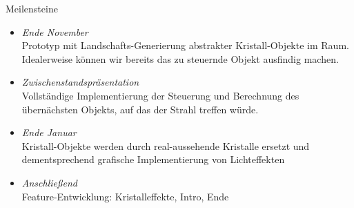 \begin{frame}{Meilensteine}
	\begin{itemize}
		\item \emph{Ende November}\\
		Prototyp mit Landschafts-Generierung abstrakter \glqq Kristall\grqq -Objekte im Raum. Idealerweise können wir bereits das zu steuernde Objekt ausfindig machen.
		\item \emph{Zwischenstandspräsentation}\\
		Vollständige Implementierung der Steuerung und Berechnung des übernächsten Objekts, auf das der Strahl treffen würde.
		\item \emph{Ende Januar}\\
		Kristall-Objekte werden durch real-aussehende Kristalle ersetzt und dementsprechend grafische Implementierung von Lichteffekten
		\item \emph{Anschließend}\\
		Feature-Entwicklung: Kristalleffekte, Intro, Ende
	\end{itemize}
\end{frame}
\nocite{*}


